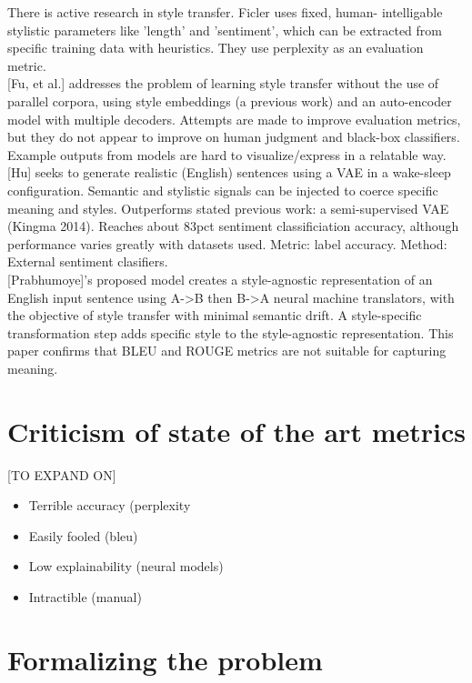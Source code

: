 \documentclass[letterpaper, 10 pt, conference]{ieeeconf}  %
\begin{document}
There is active research in style transfer. Ficler uses fixed, human- intelligable stylistic parameters like ’length’ and ’sentiment’, which can be extracted from specific training data with heuristics. They use perplexity as an evaluation metric.
\\ 

[Fu, et al.] addresses the problem of learning style transfer without the use of parallel corpora, using style embeddings (a previous work) and an auto-encoder model with multiple decoders. Attempts are made to improve evaluation metrics, but they do not appear to improve on human judgment and black-box classifiers. Example outputs from models are hard to visualize/express in a relatable way.
\\ 

[Hu] seeks to generate realistic (English) sentences using a VAE in a wake-sleep configuration. Semantic and stylistic signals can be injected to coerce specific meaning and styles.
Outperforms stated previous work: a semi-supervised VAE (Kingma 2014). Reaches about 83pct sentiment classificiation accuracy, although performance varies greatly with datasets used. 
Metric: label accuracy. Method: External sentiment clasifiers.
\\ 

[Prabhumoye]'s proposed model creates a style-agnostic representation of an English input sentence using A->B then B->A neural machine translators, with the objective of style transfer with minimal semantic drift. A style-specific transformation step adds specific style to the style-agnostic representation. This paper confirms that BLEU and ROUGE metrics are not suitable for capturing meaning.

\section{Criticism of state of the art metrics}
[TO EXPAND ON]
\begin{itemize}
  \item Terrible accuracy (perplexity
  \item Easily fooled (bleu)
  \item Low explainability (neural models)
  \item Intractible (manual)
\end{itemize}

\section{Formalizing the problem}
\end{document}
